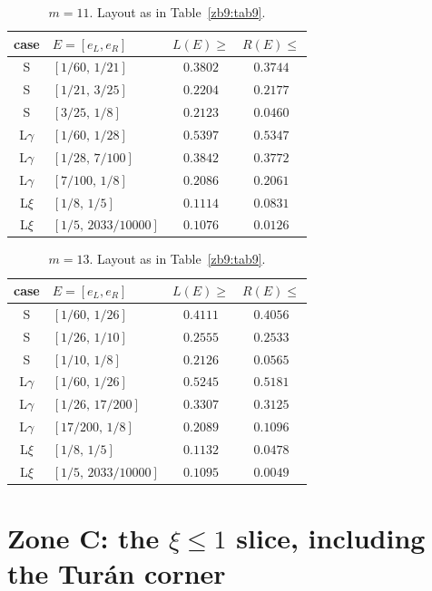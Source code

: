 \documentclass[11pt]{amsart}
\begin{document}
\begin{table}[h]\centering
\caption{$m=11$.  Layout as in Table~\ref{zb9:tab9}.}\label{zb9:tab11}
\begin{tabular}{clcc}\toprule
case & $E=[e_L,e_R]$ & $L(E)\ge$ & $R(E)\le$\\\midrule
S       & $[1/60,\,1/21]$    & $0.3802$ & $0.3744$\\
S       & $[1/21,\,3/25]$    & $0.2204$ & $0.2177$\\
S       & $[3/25,\,1/8]$     & $0.2123$ & $0.0460$\\\midrule
L$\gamma$ & $[1/60,\,1/28]$  & $0.5397$ & $0.5347$\\
L$\gamma$ & $[1/28,\,7/100]$ & $0.3842$ & $0.3772$\\
L$\gamma$ & $[7/100,\,1/8]$  & $0.2086$ & $0.2061$\\\midrule
L$\xi$  & $[1/8,\,1/5]$      & $0.1114$ & $0.0831$\\
L$\xi$  & $[1/5,\,2033/10000]$ & $0.1076$ & $0.0126$\\
\bottomrule\end{tabular}
\end{table}

\begin{table}[h]\centering
\caption{$m=13$.  Layout as in Table~\ref{zb9:tab9}.}\label{zb9:tab13}
\begin{tabular}{clcc}\toprule
case & $E=[e_L,e_R]$ & $L(E)\ge$ & $R(E)\le$\\\midrule
S       & $[1/60,\,1/26]$    & $0.4111$ & $0.4056$\\
S       & $[1/26,\,1/10]$    & $0.2555$ & $0.2533$\\
S       & $[1/10,\,1/8]$     & $0.2126$ & $0.0565$\\\midrule
L$\gamma$ & $[1/60,\,1/26]$  & $0.5245$ & $0.5181$\\
L$\gamma$ & $[1/26,\,17/200]$& $0.3307$ & $0.3125$\\
L$\gamma$ & $[17/200,\,1/8]$ & $0.2089$ & $0.1096$\\\midrule
L$\xi$  & $[1/8,\,1/5]$      & $0.1132$ & $0.0478$\\
L$\xi$  & $[1/5,\,2033/10000]$ & $0.1095$ & $0.0049$\\
\bottomrule\end{tabular}
\end{table}

\section{Zone C: the $\xi\le1$ slice, including the Tur\'an corner}\label{sec:zoneC}
\end{document}
